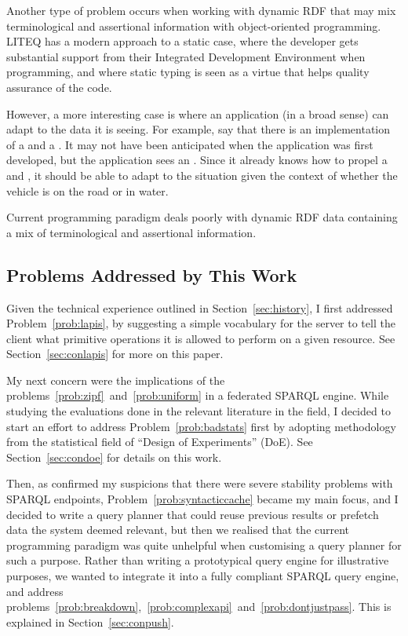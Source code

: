Another type of problem occurs when working with dynamic RDF that may
mix terminological and assertional information with object-oriented
programming. LITEQ \cite{leinberger2014semantic} has a modern approach
to a static case, where the developer gets substantial support from
their Integrated Development Environment when programming, and where
static typing is seen as a virtue that helps quality assurance of the
code.

However, a more interesting case is where an application (in a broad
sense) can adapt to the data it is seeing. For example, say that there
is an implementation of a  and a . It may
not have been anticipated when the application was first developed,
but the application sees an . Since it
already knows how to propel a  and , it
should be able to adapt to the situation given the context of whether
the vehicle is on the road or in water.

\begin{problem}\label{prob:dynaprog}
Current programming paradigm deals poorly with dynamic RDF data
containing a mix of terminological and assertional information.
\end{problem}


\subsection{Problems Addressed by This Work}\label{sec:probaddress}

Given the technical experience outlined in Section~\ref{sec:history},
I first addressed Problem~\ref{prob:lapis}, by suggesting a simple
vocabulary for the server to tell the client what primitive operations
it is allowed to perform on a given resource. See
Section~\ref{sec:conlapis} for more on this paper.

My next concern were the implications of the
problems~\ref{prob:zipf}~and~\ref{prob:uniform} in a federated SPARQL
engine. While studying the evaluations done in the relevant literature
in the field, I decided to start an effort to address
Problem~\ref{prob:badstats} first by adopting methodology from the
statistical field of ``Design of Experiments'' (DoE). See
Section~\ref{sec:condoe} for details on this work.

Then, as \cite{buil2013sparql} confirmed my suspicions that there were
severe stability problems with SPARQL endpoints,
Problem~\ref{prob:syntacticcache} became my main focus, and I decided
to write a query planner that could reuse previous results or prefetch
data the system deemed relevant, but then we realised that the current
programming paradigm was quite unhelpful when customising a query
planner for such a purpose. Rather than writing a prototypical query
engine for illustrative purposes, we wanted to integrate it into a
fully compliant SPARQL query engine, and address
problems~\ref{prob:breakdown},~\ref{prob:complexapi}~and~\ref{prob:dontjustpass}. This
is explained in Section~\ref{sec:conpush}.


